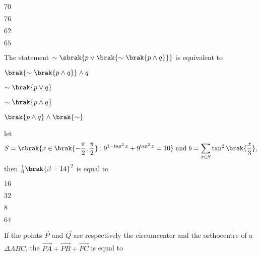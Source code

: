     \begin{enumerate}
    \begin{multicols}{4}
        \item $70$
        \item $76$
        \item $62$
        \item $65$
    \end{multicols}
    \end{enumerate}

    \item 
    The statement $\sim\sbrak{p \lor \brak{\sim \brak{p \land q}}}$ is equivalent to

    \hfill{}

    \begin{enumerate}
    \begin{multicols}{4}
        \item $\brak{\sim\brak{p \land q}} \land q$
        \item $\sim\brak{p \lor q}$
        \item $\sim\brak{p \land q}$
        \item $\brak{p \land q} \land \brak{\sim }$
    \end{multicols}   
    \end{enumerate}

    \item 
    let 
    \begin{align*}
        S = \cbrak{x \in \brak{-\frac{\pi}{2}, \frac{\pi}{2}} : 9^{1-\tan^2 x} + 9^{\tan^2 x} = 10} \text{ and } b = \sum_{x \in S} \tan^2 {\brak{\frac{x}{3}}},
   \end{align*}
   then $\frac{1}{6}\brak{\beta -14}^2$ is equal to

    \hfill{}

    \begin{enumerate}
    \begin{multicols}{4}
        \item $16$
        \item $32$
        \item $8$
        \item $64$
    \end{multicols}
    \end{enumerate}

    \item
    If the points $\vec{P}$ and $\vec{Q}$ are respectively the circumcenter and the orthocentre of a $\Delta ABC$, the $\overline{\vec{PA}} + \overline{\vec{PB}} + \overline{\vec{PC}}$ is equal to

